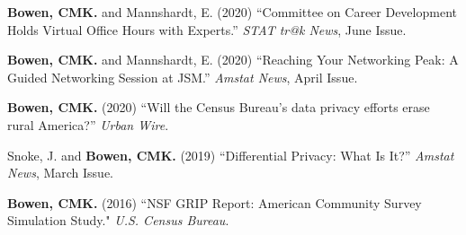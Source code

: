 \documentclass[11pt, letterpaper, roman]{moderncv} %
\begin{document}
\begin{etaremune}[topsep=0pt, itemsep=3pt, partopsep=0pt, parsep=0pt]
    \item \textbf{Bowen, CMK.} and Mannshardt, E. (2020) ``Committee on Career Development Holds Virtual Office Hours with Experts.'' \textit{STAT tr@k News}, June Issue.

    \item \textbf{Bowen, CMK.} and Mannshardt, E. (2020) ``Reaching Your Networking Peak: A Guided Networking Session at JSM.'' \textit{Amstat News}, April Issue.
    
    \item \textbf{Bowen, CMK.} (2020) ``Will the Census Bureau's data privacy efforts erase rural America?'' \textit{Urban Wire}. 
    
    \item Snoke, J. and \textbf{Bowen, CMK.} (2019) ``Differential Privacy: What Is It?'' \textit{Amstat News}, March Issue.
    
    \item \textbf{Bowen, CMK.} (2016) ``NSF GRIP Report: American Community Survey Simulation Study." \textit{U.S. Census Bureau}.  
\end{etaremune}

    
    

\end{document}
